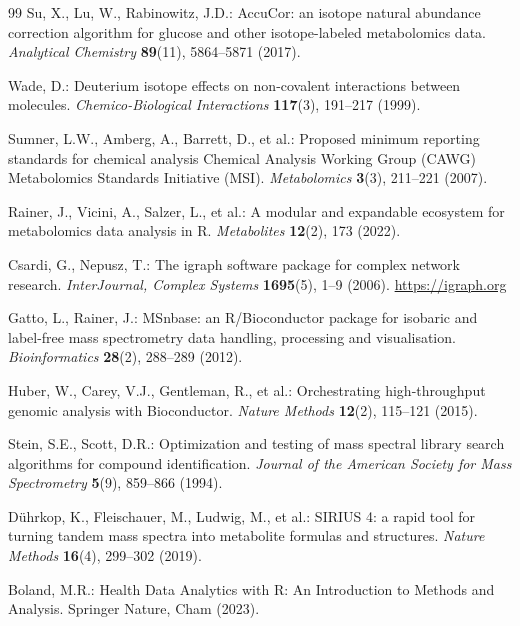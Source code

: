 \documentclass[11pt,twoside,openright]{book}
\begin{document}
\begin{thebibliography}{99}
Su, X., Lu, W., Rabinowitz, J.D.: AccuCor: an isotope natural abundance correction algorithm for glucose and other isotope-labeled metabolomics data.
\textit{Analytical Chemistry} \textbf{89}(11), 5864--5871 (2017).

Wade, D.: Deuterium isotope effects on non-covalent interactions between molecules.
\textit{Chemico-Biological Interactions} \textbf{117}(3), 191--217 (1999).

Sumner, L.W., Amberg, A., Barrett, D., et al.: Proposed minimum reporting standards for chemical analysis Chemical Analysis Working Group (CAWG) Metabolomics Standards Initiative (MSI).
\textit{Metabolomics} \textbf{3}(3), 211--221 (2007).

Rainer, J., Vicini, A., Salzer, L., et al.: A modular and expandable ecosystem for metabolomics data analysis in R.
\textit{Metabolites} \textbf{12}(2), 173 (2022).

Csardi, G., Nepusz, T.: The igraph software package for complex network research.
\textit{InterJournal, Complex Systems} \textbf{1695}(5), 1--9 (2006).
\url{https://igraph.org}

Gatto, L., Rainer, J.: MSnbase: an R/Bioconductor package for isobaric and label-free mass spectrometry data handling, processing and visualisation.
\textit{Bioinformatics} \textbf{28}(2), 288--289 (2012).

Huber, W., Carey, V.J., Gentleman, R., et al.: Orchestrating high-throughput genomic analysis with Bioconductor.
\textit{Nature Methods} \textbf{12}(2), 115--121 (2015).

Stein, S.E., Scott, D.R.: Optimization and testing of mass spectral library search algorithms for compound identification.
\textit{Journal of the American Society for Mass Spectrometry} \textbf{5}(9), 859--866 (1994).

D{\"u}hrkop, K., Fleischauer, M., Ludwig, M., et al.: SIRIUS 4: a rapid tool for turning tandem mass spectra into metabolite formulas and structures.
\textit{Nature Methods} \textbf{16}(4), 299--302 (2019).

Boland, M.R.: Health Data Analytics with R: An Introduction to Methods and Analysis.
Springer Nature, Cham (2023).

\end{thebibliography}
\end{document}

